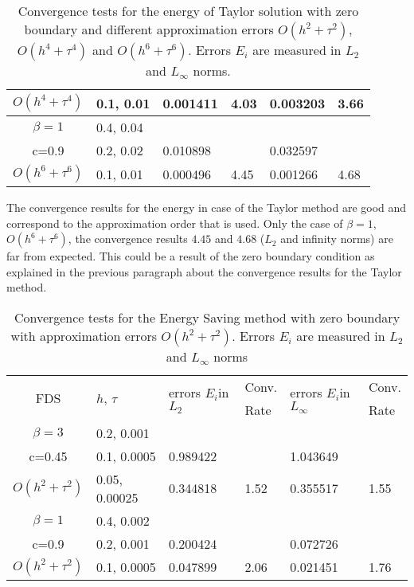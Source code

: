 \documentclass{article}
\begin{document}
\begin{table}[ht]
\begin{tabular}{||c|l|ll|ll||}
       $O(h^4+ \tau^4)$ &0.1, 0.01   &0.001411 & 4.03   & 0.003203  & 3.66  \\
    \hline
  $\beta=1$     &0.4, 0.04   &            &          &                  &      \\
      c=0.9                    &0.2, 0.02   &0.010898 &           & 0.032597      &       \\
     $O(h^6+ \tau^6)$ &0.1, 0.01 & 0.000496 &4.45 & 0.001266  & 4.68        \\
	   \hline
			\hline 
		\end{tabular}
		\caption{Convergence tests for the energy of Taylor solution with zero boundary and different approximation errors $O(h^{2} + \tau^2 )$, $O(h^{4} + \tau^4 )$ and $O(h^{6} + \tau^6 )$. Errors $E_i$ are measured in $L_2$ and $L_\infty$ norms.}
\label{table:B}
\end{table}
 
The convergence results for the energy in case of the Taylor method are good and correspond to the approximation order that is used. Only the case of $\beta = 1$, $O(h^6 + \tau^6)$, the convergence results $4.45$ and $4.68$ ($L_2$ and infinity norms) are far from expected. This could be a result of the zero boundary condition as explained in the previous paragraph about the convergence results for the Taylor method.

\begin{table}[ht]
\centering
\small
		\begin{tabular}{||c|l|ll|ll||}
			\hline
			\hline
      \multirow{2  }{*}{FDS}        & \multirow{2  }{*}{$h$, $\tau$}  & \multirow{2  }{*}{errors $E_i$in$L_2$}  &Conv.& \multirow{2  }{*}{errors $E_i$in$L_\infty$}  &Conv.  \\
	                                        &                                                     &                                                                 &  Rate &                                                                       & Rate \\
   			\hline 
					\hline 
  $\beta=3$                &0.2, 0.001         &                    &                &                  &                   \\
   c=0.45                     &0.1, 0.0005         & 0.989422   &                & 1.043649  &                   \\
     $O(h^2 + \tau^ 2)$ &0.05, 0.00025  &0.344818    & 1.52       & 0.355517   &   1.55   \\
	   \hline
			\hline 
       $\beta=1$           & 0.4, 0.002       &                   &           &                 &   \\
                  c=0.9       & 0.2, 0.001        & 0.200424   &          &0.072726  &   \\
  $O(h^2+ \tau^2)$  & 0.1, 0.0005       & 0.047899   & 2.06  &0.021451  & 1.76 \\
	   \hline
			\hline 
		\end{tabular}
		\caption{Convergence tests for the Energy Saving method with zero boundary with approximation errors $O(h^{2} + \tau^2 )$. Errors $E_i$ are measured in $L_2$ and $L_\infty$ norms}
\label{tableC}
\end{table}
\end{document}
